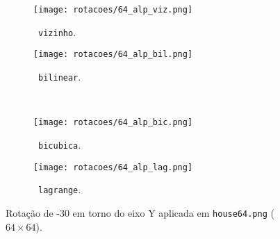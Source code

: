 \begin{figure}[H]
    \centering
    \begin{subfigure}{0.3\textwidth}
        \centering
        \texttt{[image: rotacoes/64\_alp\_viz.png]}
        \caption{~\texttt{vizinho}.}
    \end{subfigure}%
    \hspace{8pt}%
    \begin{subfigure}{0.3\textwidth}
        \centering
        \texttt{[image: rotacoes/64\_alp\_bil.png]}
        \caption{~\texttt{bilinear}.}
    \end{subfigure}
    \\[8pt]
    \begin{subfigure}{0.3\textwidth}
        \centering
        \texttt{[image: rotacoes/64\_alp\_bic.png]}
        \caption{~\texttt{bicubica}.}
    \end{subfigure}%
    \hspace{8pt}%
    \begin{subfigure}{0.3\textwidth}
        \centering
        \texttt{[image: rotacoes/64\_alp\_lag.png]}
        \caption{~\texttt{lagrange}.}
    \end{subfigure}

    \caption{Rotação de -30\textdegree{} em torno do eixo Y aplicada em \texttt{house64.png} ($64 \times 64$).}
    \label{fig:rot:house64}
\end{figure}